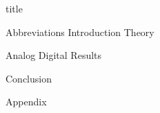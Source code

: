 \documentclass{article}
\begin{document}
{title}

\frontmatter

\tableofcontents

\listoffigures

\mainmatter

{Abbreviations}
{Introduction}
{Theory}

{Analog}
{Digital}
{Results}

{Conclusion}

{Appendix}

\addappendix

\end{document}
